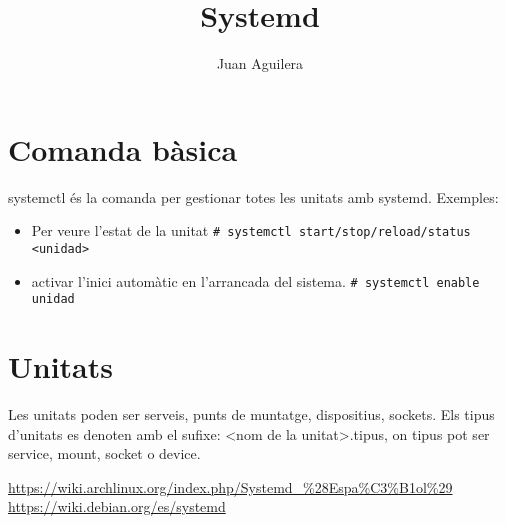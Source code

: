 \documentclass[a4paper]{article}
\begin{document}
\title{Systemd}
\author{Juan Aguilera}
\maketitle

\begin{comment}
oddsidemargin \the\oddsidemargin \newline
textwidth \the\textwidth \newline
marginparsep \the\marginparsep \newline
marginparwidth \the\marginparwidth \newline
hoffset \the\hoffset \newline
paperwidth \the\paperwidth 
\end{comment}

\section{Comanda bàsica}
systemctl és la comanda per gestionar totes les unitats amb systemd. Exemples:

\begin{itemize}
	\item Per veure l'estat de la unitat  \newline
	\verb+# systemctl start/stop/reload/status <unidad>+ 
	\item activar l'inici automàtic en l'arrancada del sistema. \newline
	\verb+# systemctl enable unidad+ 
\end{itemize}

\section{Unitats}

Les unitats poden ser serveis, punts de muntatge, dispositius, sockets. Els tipus d'unitats es denoten amb el sufixe: <nom de la unitat>.tipus, on tipus pot ser service, mount, socket o device.

\begin{thebibliography}{99}
	 \url{https://wiki.archlinux.org/index.php/Systemd_%28Espa%C3%B1ol%29}
	 \url{https://wiki.debian.org/es/systemd}
	
\end{thebibliography}
\end{document}
